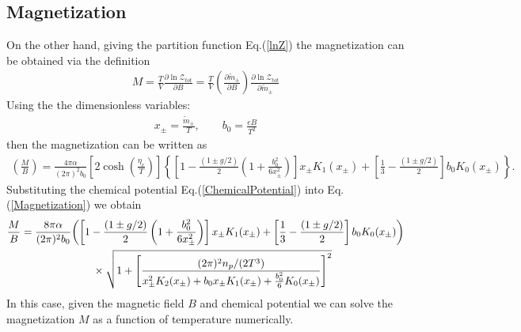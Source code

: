 \documentclass[Universe,article,submit,moreauthors,pdftex]{Definitions/mdpi}
\begin{document}
\subsection{Magnetization}
On the other hand, giving the partition function Eq.(\ref{lnZ}) the magnetization can be obtained via the definition
\begin{align}
M=\frac{T}{V}\frac{\partial \ln\mathcal{Z}_{tot}}{\partial B}=\frac{T}{V}\left(\frac{\partial\tilde m_\pm}{\partial B}\right)\frac{\partial \ln\mathcal{Z}_{tot}}{\partial\tilde m_\pm}
\end{align}
Using the the dimensionless variables:
\begin{align}
x_\pm=\frac{\tilde m_\pm}{T},\qquad b_0=\frac{eB}{T^2}
\end{align}
then the magnetization can be written as
\begin{align}\label{Magnetization}
\left(\frac{M}{B}\right)=\frac{4\pi\alpha}{(2\pi)^2b_0}\left[2\cosh\left(\frac{\eta_{e}}{T}\right)\right]\left\{\left[1-\frac{(1\pm g/2)}{2}\left(1+\frac{b^2_0}{6x^2_\pm}\right)\right]x_\pm K_1(x_\pm)+\left[\frac{1}{3}-\frac{(1\pm g/2)}{2}\right]b_0K_0(x_\pm)\right\}.
\end{align}
Substituting the chemical potential Eq.(\ref{ChemicalPotential}) into Eq.(\ref{Magnetization}) we obtain
\begin{align}
\frac{M}{B}=\frac{8\pi\alpha}{(2\pi)^2b_0}&{\left(\left[1-\frac{(1\pm g/2)}{2}\left(1+\frac{b^2_0}{6x^2_\pm}\right)\right]x_\pm K_1(x_\pm)+\left[\frac{1}{3}-\frac{(1\pm g/2)}{2}\right]b_0K_0(x_\pm)\right)}\notag\\
&\qquad\times\sqrt{1+\left[\frac{{(2\pi)^2n_p}/{(2T^3)}}{x_\pm^2K_2(x_\pm)+b_0x_\pm K_1(x_\pm)+\frac{b^2_0}{6}K_0(x_\pm)}\right]^2}
\end{align}
In this case, given the magnetic field $B$ and chemical potential we can solve the magnetization $M$ as a function of temperature numerically.
\end{document}
